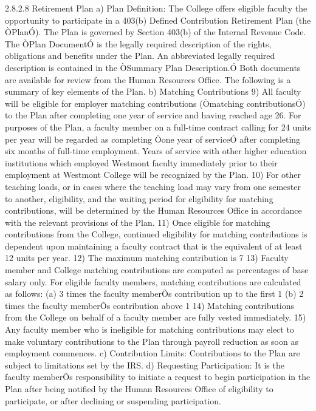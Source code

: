 \documentclass[letterpaper, 11pt]{article}
\begin{document}
2.8.2.8 Retirement Plan 
a) Plan Definition:  The College offers eligible faculty the opportunity to participate in a 403(b) Defined Contribution Retirement Plan (the ÒPlanÓ).  The Plan is governed by Section 403(b) of the Internal Revenue Code.  The ÒPlan DocumentÓ is the legally required description of the rights, obligations and benefits under the Plan.  An abbreviated legally required description is contained in the ÒSummary Plan Description.Ó  Both documents are available for review from the Human Resources Office.  The following is a summary of key elements of the Plan.
b) Matching Contributions
9) All faculty will be eligible for employer matching contributions (Òmatching contributionsÓ) to the Plan after completing one year of service and having reached age 26.  For purposes of the Plan, a faculty member on a full-time contract calling for 24 units per year will be regarded as completing Òone year of serviceÓ after completing six months of full-time employment.  Years of service with other higher education institutions which employed Westmont faculty immediately prior to their employment at Westmont College will be recognized by the Plan.
10) For other teaching loads, or in cases where the teaching load may vary from one semester to another, eligibility, and the waiting period for eligibility for matching contributions, will be determined by the Human Resources Office in accordance with the relevant provisions of the Plan.
11) Once eligible for matching contributions from the College, continued eligibility for matching contributions is dependent upon maintaining a faculty contract that is the equivalent of at least 12 units per year.
12) The maximum matching contribution is 7%
13) Faculty member and College matching contributions are computed as percentages of base salary only.  For eligible faculty members, matching contributions are calculated as follows:
(a) 3 times the faculty memberÕs contribution up to the first 1%
(b) 2 times the faculty memberÕs contribution above 1%
14) Matching contributions from the College on behalf of a faculty member are fully vested immediately.
15) Any faculty member who is ineligible for matching contributions may elect to make voluntary contributions to the Plan through payroll reduction as soon as employment commences.
c) Contribution Limits:  Contributions to the Plan are subject to limitations set by the IRS.
d) Requesting Participation:  It is the faculty memberÕs responsibility to initiate a request to begin participation in the Plan after being notified by the Human Resources Office of eligibility to participate, or after declining or suspending participation.
\end{document}
